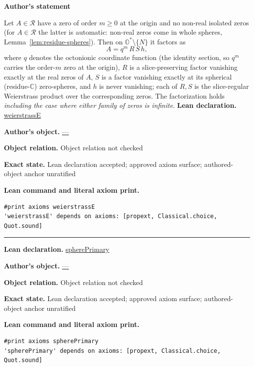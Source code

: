 \documentclass[11pt]{article}
\newcommand{\OO}{\mathbb{O}}
\newcommand{\CC}{\mathbb{C}}
\theoremstyle{plain}
\theoremstyle{definition}
\theoremstyle{remark}
\begin{document}
\medskip
\begin{tcolorbox}[provenancecard,title={41. Proposition - Slice-regular Weierstrass factorization; the content of C3},title after break={41. Proposition - Slice-regular Weierstrass factorization; the content of C3 (continued)}]
\textbf{Author's statement}\par
Let $A\in\mathcal R$ have a zero of order $m\ge 0$ at the origin and no non-real isolated zeros
\textup{(}for $A\in\mathcal R$ the latter is automatic: non-real zeros come in whole spheres,
Lemma~\ref{lem:residue-spheres}\textup{)}. Then on $\OO^{*}\setminus\{N\}$ it factors as
\[
  A=q^{m}\,R\,S\,h,
\]
where $q$ denotes the octonionic coordinate function \textup{(}the identity section, so $q^m$
carries the order-$m$ zero at the origin\textup{)}, $R$ is a slice-preserving factor vanishing
exactly at the real zeros of $A$, $S$ is a factor vanishing exactly at its spherical
\textup{(}residue-$\CC$\textup{)} zero-spheres, and $h$ is never vanishing; each of $R,S$ is the
slice-regular Weierstrass product over the corresponding zeros. The factorization holds
\emph{including the case where either family of zeros is infinite}.
\tcblower
\textbf{Lean declaration.} \url{weierstrassE}
\par\textbf{Author's object.} \url{—}
\par\textbf{Object relation.} Object relation not checked
\par\textbf{Exact state.} Lean declaration accepted; approved axiom surface; authored-object anchor unratified
\par\smallskip\textbf{Lean command and literal axiom print.}
\begin{Verbatim}[breaklines=true,breakanywhere=true,fontsize=\small]
#print axioms weierstrassE
'weierstrassE' depends on axioms: [propext, Classical.choice, Quot.sound]
\end{Verbatim}
\medskip\hrule\medskip
\textbf{Lean declaration.} \url{spherePrimary}
\par\textbf{Author's object.} \url{—}
\par\textbf{Object relation.} Object relation not checked
\par\textbf{Exact state.} Lean declaration accepted; approved axiom surface; authored-object anchor unratified
\par\smallskip\textbf{Lean command and literal axiom print.}
\begin{Verbatim}[breaklines=true,breakanywhere=true,fontsize=\small]
#print axioms spherePrimary
'spherePrimary' depends on axioms: [propext, Classical.choice, Quot.sound]

\end{Verbatim}
\end{tcolorbox}
\end{document}
